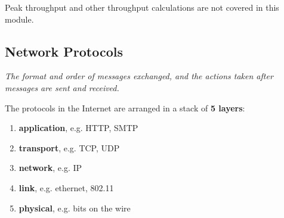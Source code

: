 Peak throughput and other throughput calculations are not covered in this module.

\subsection{Network Protocols}
\emph{The format and order of messages exchanged, and the actions taken after messages are sent and received.}

The protocols in the Internet are arranged in a stack of \textbf{5 layers}:
\begin{enumerate}
    \item \textbf{application}, e.g. HTTP, SMTP
    \item \textbf{transport}, e.g. TCP, UDP
    \item \textbf{network}, e.g. IP
    \item \textbf{link}, e.g. ethernet, 802.11
    \item \textbf{physical}, e.g. bits on the wire
\end{enumerate}